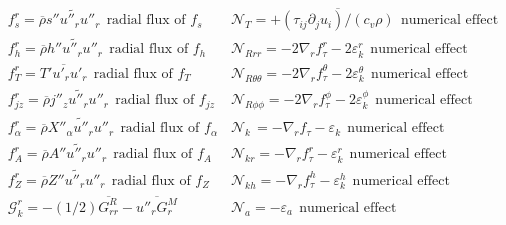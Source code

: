 \documentclass[10pt,paper=a4]{report}
\newcommand{\eht}{\overline}
\newcommand{\fht}{\widetilde}
\begin{document}
\begin{table*}
\begin{align}
& f_s^r = \eht{\rho}\fht{s'' u''_r u''_r} \ \ \mbox{radial flux of $f_s$}               & &  \mathcal N_{T} = +\eht{(\tau_{ij} \partial_j u_i)/(c_v \rho)}  \ \ \mbox{numerical effect} \nonumber \\ 
& f_h^r = \eht{\rho}\fht{h'' u''_r u''_r} \ \ \mbox{radial flux of $f_h$}               & & \mathcal N_{Rrr} = -2\nabla_r f_\tau^r - 2\varepsilon_k^r \ \ \mbox{numerical effect} \nonumber \\
& f_T^r = \eht{T' u'_r u'_r} \ \ \mbox{radial flux of $f_T$}                            & &  \mathcal N_{R\theta \theta} = -2\nabla_r f_\tau^\theta - 2\varepsilon_k^\theta  \ \ \mbox{numerical effect} \nonumber \\
& f_{jz}^r = \eht{\rho}\fht{j''_z u''_r u''_r} \ \ \mbox{radial flux of $f_{jz}$}                           & &  \mathcal N_{R\phi \phi} = -2\nabla_r f_\tau^\phi - 2\varepsilon_k^\phi \ \ \mbox{numerical effect} \nonumber \\
& f_\alpha^r =  \eht{\rho}\fht{X''_\alpha u''_r u''_r} \ \ \mbox{radial flux of $f_\alpha$} & &  \mathcal N_{k \ } = -\nabla_r f_\tau - \varepsilon_k  \ \ \mbox{numerical effect} \nonumber \\                          
& f_A^r = \eht{\rho}\fht{A'' u''_r u''_r} \ \ \mbox{radial flux of $f_A$}               & &  \mathcal N_{kr} = -\nabla_r f_\tau^r - \varepsilon_k^r \ \ \mbox{numerical effect} \nonumber \\                                 
& f_Z^r = \eht{\rho}\fht{Z'' u''_r u''_r} \ \ \mbox{radial flux of $f_Z$}               & &  \mathcal N_{kh} = -\nabla_r f_\tau^h - \varepsilon_k^h \ \ \mbox{numerical effect} \nonumber \\                                        
& \mathcal G_k^r = -(1/2)\eht{G_{rr}^R} - \eht{u''_rG_r^M}                 & &  \mathcal N_a = -\varepsilon_a \ \ \mbox{numerical effect} \nonumber                          
\end{align}
\end{table*} 



\newpage
\end{document}
